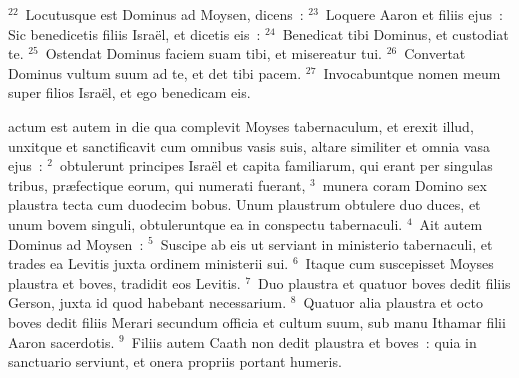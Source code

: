 ${}^{22}$~Locutusque est Dominus ad Moysen, dicens~:
${}^{23}$~Loquere Aaron et filiis ejus~: Sic benedicetis filiis Isra\"el, et dicetis eis~:
${}^{24}$~Benedicat tibi Dominus, et custodiat te.
${}^{25}$~Ostendat Dominus faciem suam tibi, et misereatur tui.
${}^{26}$~Convertat Dominus vultum suum ad te, et det tibi pacem.
${}^{27}$~Invocabuntque nomen meum super filios Isra\"el, et ego benedicam eis.

\bchapter
{}actum est autem in die qua complevit Moyses tabernaculum, et erexit illud, unxitque et sanctificavit cum omnibus vasis suis, altare similiter et omnia vasa ejus~:
${}^{2}$~obtulerunt principes Isra\"el et capita familiarum, qui erant per singulas tribus, pr\ae fectique eorum, qui numerati fuerant,
${}^{3}$~munera coram Domino sex plaustra tecta cum duodecim bobus. Unum plaustrum obtulere duo duces, et unum bovem singuli, obtuleruntque ea in conspectu tabernaculi.
${}^{4}$~Ait autem Dominus ad Moysen~:
${}^{5}$~Suscipe ab eis ut serviant in ministerio tabernaculi, et trades ea Levitis juxta ordinem ministerii sui.
${}^{6}$~Itaque cum suscepisset Moyses plaustra et boves, tradidit eos Levitis.
${}^{7}$~Duo plaustra et quatuor boves dedit filiis Gerson, juxta id quod habebant necessarium.
${}^{8}$~Quatuor alia plaustra et octo boves dedit filiis Merari secundum officia et cultum suum, sub manu Ithamar filii Aaron sacerdotis.
${}^{9}$~Filiis autem Caath non dedit plaustra et boves~: quia in sanctuario serviunt, et onera propriis portant humeris.


